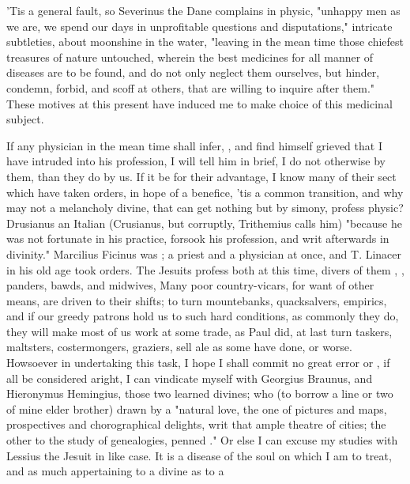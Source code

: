 'Tis a general fault, so Severinus the Dane complains in
physic, "unhappy men as we are, we spend our days in unprofitable questions and
disputations," intricate subtleties,  about moonshine in
the water, "leaving in the mean time those chiefest treasures of nature
untouched, wherein the best medicines for all manner of diseases are to be
found, and do not only neglect them ourselves, but hinder, condemn, forbid, and
scoff at others, that are willing to inquire after them." These motives at this
present have induced me to make choice of this medicinal subject.

If any physician in the mean time shall infer, ,
and find himself grieved that I have intruded into his profession, I will tell
him in brief, I do not otherwise by them, than they do by us. If it be for
their advantage, I know many of their sect which have taken orders, in hope of
a benefice, 'tis a common transition, and why may not a melancholy divine, that
can get nothing but by simony, profess physic? Drusianus an Italian (Crusianus,
but corruptly, Trithemius calls him) "because he was not
fortunate in his practice, forsook his profession, and writ afterwards in
divinity." Marcilius Ficinus was ; a priest and a physician
at once, and T. Linacer in his old age took orders. The
Jesuits profess both at this time, divers of them ,
, panders, bawds, and midwives, \etc{} Many poor
country-vicars, for want of other means, are driven to their shifts; to turn
mountebanks, quacksalvers, empirics, and if our greedy patrons hold us to such
hard conditions, as commonly they do, they will make most of us work at some
trade, as Paul did, at last turn taskers, maltsters, costermongers, graziers,
sell ale as some have done, or worse. Howsoever in undertaking this task, I
hope I shall commit no great error or , if all be considered
aright, I can vindicate myself with Georgius Braunus, and Hieronymus Hemingius,
those two learned divines; who (to borrow a line or two of mine
elder brother) drawn by a "natural love, the one of
pictures and maps, prospectives and chorographical delights, writ that ample
theatre of cities; the other to the study of genealogies, penned ." Or else I can excuse my studies with
Lessius the Jesuit in like case. It is a disease of the
soul on which I am to treat, and as much appertaining to a divine as to a
